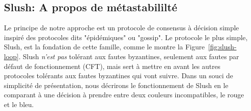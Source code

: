\documentclass[letterpaper,twocolumn,10pt]{article}
\DeclarePairedDelimiter{\floor}{\lfloor}{\rfloor}
\theoremstyle{definition}
\begin{document}
\subsection{Slush: A propos de métastabililté}


Le principe de notre approche est un protocole de consensus à décision simple inspiré des protocoles dits "épidémiques"
ou "gossip". Le protocole le plus simple, Slush, est la fondation de cette famille, comme le montre la
Figure~\ref{fig:slush-loop}. Slush \emph{n'est pas} tolérant aux fautes byzantines, seulement aux fautes par défaut
de fonctionnement (CFT), mais sert à mettre en avant les autres protocoles tolérants aux fautes byzantines qui vont
suivre. Dans un souci de simplicité de présentation, nous décrirons le fonctionnement de Slush en le comparant
à une décision à prendre entre deux couleurs incompatibles, le rouge et le bleu.

\end{document}
